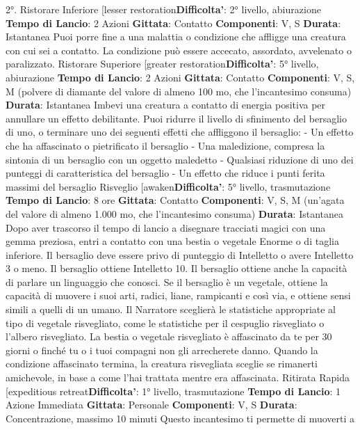 \begin{multicols}{2}
2°.
Ristorare Inferiore
[lesser restoration\textbf{Difficolta'}:
2° livello, abiurazione
\textbf{Tempo di Lancio}: 2 Azioni
\textbf{Gittata}: Contatto
\textbf{Componenti}: V, S
\textbf{Durata}: Istantanea
Puoi porre fine a una malattia o condizione che affligge
una creatura con cui sei a contatto. La condizione può
essere accecato, assordato, avvelenato o paralizzato.
Ristorare Superiore
[greater restoration\textbf{Difficolta'}:
5° livello, abiurazione
\textbf{Tempo di Lancio}: 2 Azioni
\textbf{Gittata}: Contatto
\textbf{Componenti}: V, S, M (polvere di diamante del valore di
almeno 100 mo, che l’incantesimo consuma)
\textbf{Durata}: Istantanea
Imbevi una creatura a contatto di energia positiva per
annullare un effetto debilitante. Puoi ridurre il livello di
sfinimento del bersaglio di uno, o terminare uno dei
seguenti effetti che affliggono il bersaglio:
- Un effetto che ha affascinato o pietrificato il
bersaglio
- Una maledizione, compresa la sintonia di un
bersaglio con un oggetto maledetto
- Qualsiasi riduzione di uno dei punteggi di
caratteristica del bersaglio
- Un effetto che riduce i punti ferita massimi del
bersaglio
Risveglio
[awaken\textbf{Difficolta'}:
5° livello, trasmutazione
\textbf{Tempo di Lancio}: 8 ore
\textbf{Gittata}: Contatto
\textbf{Componenti}: V, S, M (un’agata del valore di almeno
1.000 mo, che l’incantesimo consuma)
\textbf{Durata}: Istantanea
Dopo aver trascorso il tempo di lancio a disegnare
tracciati magici con una gemma preziosa, entri a
contatto con una bestia o vegetale Enorme o di taglia
inferiore. Il bersaglio deve essere privo di punteggio di
Intelletto o avere Intelletto 3 o meno. Il bersaglio
ottiene Intelletto 10. Il bersaglio ottiene anche la
capacità di parlare un linguaggio che conosci. Se il
bersaglio è un vegetale, ottiene la capacità di muovere i
suoi arti, radici, liane, rampicanti e così via, e ottiene
sensi simili a quelli di un umano. Il Narratore sceglierà le
statistiche appropriate al tipo di vegetale risvegliato,
come le statistiche per il cespuglio risvegliato o l’albero
risvegliato.
La bestia o vegetale risvegliato è affascinato da te per
30 giorni o finché tu o i tuoi compagni non gli
arrecherete danno. Quando la condizione affascinato
termina, la creatura risvegliata sceglie se rimanerti
amichevole, in base a come l’hai trattata mentre era
affascinata.
Ritirata Rapida
[expeditious retreat\textbf{Difficolta'}:
1° livello, trasmutazione
\textbf{Tempo di Lancio}: 1 Azione Immediata
\textbf{Gittata}: Personale
\textbf{Componenti}: V, S
\textbf{Durata}: Concentrazione, massimo 10 minuti
Questo incantesimo ti permette di muoverti a

\end{multicols}
